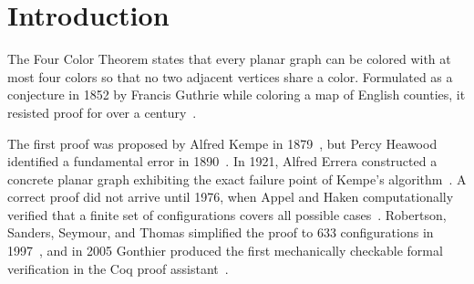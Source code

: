 \documentclass[12pt,letterpaper]{article}
\theoremstyle{plain}
\theoremstyle{definition}
\theoremstyle{remark}
\begin{document}
\begin{abstract}
We document the mathematical and algorithmic design of a computational
visualization system for the Four Color Theorem, implemented in Python with the
libraries \texttt{NetworkX}, \texttt{NumPy}, \texttt{SciPy}, and
\texttt{Matplotlib}. The system operates on arbitrary planar graphs and executes
a transformation pipeline that includes: planarity verification via the
Boyer-Myrvold algorithm~\cite{boyermyrvold1999}; straight-line drawing via the
Tutte embedding~\cite{tutte1963}; topological layer decomposition via outer-face
peeling; inverse-order greedy coloring; analysis of Kempe
chains~\cite{kempe1879}; and CSP backtracking with MRV and forward checking when
the greedy fails to produce four colors. The Errera~\cite{errera1921} and
Kittell~\cite{kittell1935} graphs are used as canonical test cases, concretely
demonstrating the failure mechanism of Kempe's algorithm via tangled chains. The
document includes complete mathematical foundations for each step, precise
numerical values computed on the Errera graph, and situates the work historically
from Kempe's incorrect proof to Gonthier's formal verification in
Coq~\cite{gonthier2008}.
\end{abstract}

\tableofcontents
\newpage

\section{Introduction}

The Four Color Theorem states that every planar graph can be colored with at
most four colors so that no two adjacent vertices share a color. Formulated as a
conjecture in 1852 by Francis Guthrie while coloring a map of English counties,
it resisted proof for over a century~\cite{wilson2002}.

The first proof was proposed by Alfred Kempe in 1879~\cite{kempe1879}, but Percy
Heawood identified a fundamental error in 1890~\cite{heawood1890}. In 1921,
Alfred Errera constructed a concrete planar graph exhibiting the exact failure
point of Kempe's algorithm~\cite{errera1921}. A correct proof did not arrive
until 1976, when Appel and Haken computationally verified that a finite set of
configurations covers all possible cases~\cite{appelhaken1977}. Robertson,
Sanders, Seymour, and Thomas simplified the proof to 633 configurations in
1997~\cite{robertson1997}, and in 2005 Gonthier produced the first mechanically
checkable formal verification in the Coq proof
assistant~\cite{gonthier2008}.
\end{document}
